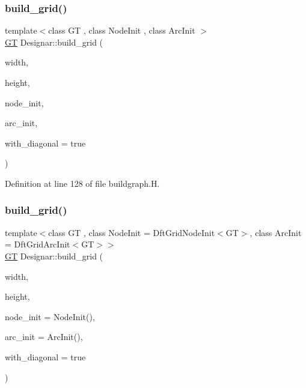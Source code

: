 \mbox{\label{namespace_designar_aec5eb60a497214494947086c4cd7af76}} 
\subsubsection{\texorpdfstring{build\+\_\+grid()}{build\_grid()}\hspace{0.1cm}{\footnotesize\ttfamily [1/2]}}
{\footnotesize\ttfamily template$<$class GT , class Node\+Init , class Arc\+Init $>$ \\
\hyperlink{demo-buildgraph_8_c_a3001c40d2c31ca87ed96cd7d1334a55e}{GT} Designar\+::build\+\_\+grid (\begin{DoxyParamCaption}\item[{\hyperlink{namespace_designar_aa72662848b9f4815e7bf31a7cf3e33d1}{nat\+\_\+t}}]{width,  }\item[{\hyperlink{namespace_designar_aa72662848b9f4815e7bf31a7cf3e33d1}{nat\+\_\+t}}]{height,  }\item[{Node\+Init \&}]{node\+\_\+init,  }\item[{Arc\+Init \&}]{arc\+\_\+init,  }\item[{bool}]{with\+\_\+diagonal = {\ttfamily true} }\end{DoxyParamCaption})}



Definition at line 128 of file buildgraph.\+H.

\mbox{\label{namespace_designar_a57d0b4318f5ae1ef0082a67d7eeb10fe}} 
\subsubsection{\texorpdfstring{build\+\_\+grid()}{build\_grid()}\hspace{0.1cm}{\footnotesize\ttfamily [2/2]}}
{\footnotesize\ttfamily template$<$class GT , class Node\+Init  = Dft\+Grid\+Node\+Init$<$\+G\+T$>$, class Arc\+Init  = Dft\+Grid\+Arc\+Init$<$\+G\+T$>$$>$ \\
\hyperlink{demo-buildgraph_8_c_a3001c40d2c31ca87ed96cd7d1334a55e}{GT} Designar\+::build\+\_\+grid (\begin{DoxyParamCaption}\item[{\hyperlink{namespace_designar_aa72662848b9f4815e7bf31a7cf3e33d1}{nat\+\_\+t}}]{width,  }\item[{\hyperlink{namespace_designar_aa72662848b9f4815e7bf31a7cf3e33d1}{nat\+\_\+t}}]{height,  }\item[{Node\+Init \&\&}]{node\+\_\+init = {\ttfamily NodeInit()},  }\item[{Arc\+Init \&\&}]{arc\+\_\+init = {\ttfamily ArcInit()},  }\item[{bool}]{with\+\_\+diagonal = {\ttfamily true} }\end{DoxyParamCaption})}




